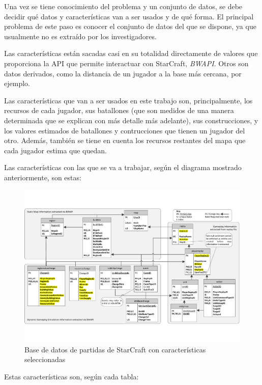 \documentclass[a4paper,11pt]{book}\usepackage[]{graphicx}\usepackage[]{color}
\makeatletter
\def\maxwidth{ %
  \ifdim\Gin@nat@width>\linewidth
    \linewidth
  \else
    \Gin@nat@width
  \fi
}
\makeatother
\begin{document}
Una vez se tiene conocimiento del problema y un conjunto de datos, se debe decidir qué datos y características van a ser usados y de qué forma. El principal problema de este paso es conocer el conjunto de datos del que se dispone, ya que usualmente no es extraído por los investigadores.

Las características están sacadas casi en su totalidad directamente de valores que proporciona la API que permite interactuar con StarCraft, \emph{BWAPI}. Otros son datos derivados, como la distancia de un jugador a la base más cercana, por ejemplo.

Las características que van a ser usados en este trabajo son, principalmente, los recursos de cada jugador, sus batallones (que son medidos de una manera determinada que se explican con más detalle más adelante), sus construcciones, y los valores estimados de batallones y contrucciones que tienen un jugador del otro. Además, también se tiene en cuenta los recursos restantes del mapa que cada jugador estima que quedan.

Las características con las que se va a trabajar, según el diagrama mostrado anteriormente, son estas:

\begin{figure}
    \centering
    \includegraphics[width=\maxwidth]{figure/Robertson14DatabaseDiagramSeleccion}
    \caption{Base de datos de partidas de StarCraft con características seleccionadas}
\end{figure}


Estas características son, según cada tabla:
\end{document}
